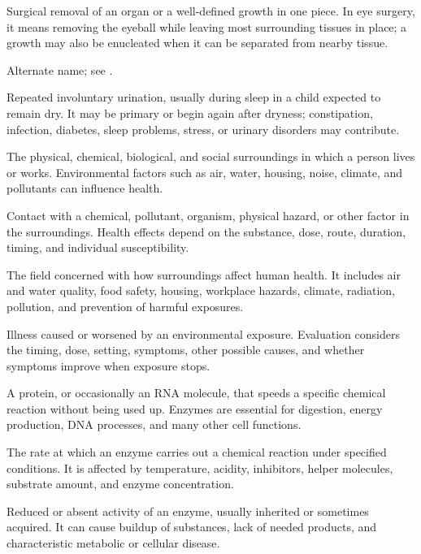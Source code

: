  Surgical removal of an organ or a well-defined growth in one piece. In eye surgery, it means removing the eyeball while leaving most surrounding tissues in place; a growth may also be enucleated when it can be separated from nearby tissue.

 Alternate name; see .

 Repeated involuntary urination, usually during sleep in a child expected to remain dry. It may be primary or begin again after dryness; constipation, infection, diabetes, sleep problems, stress, or urinary disorders may contribute.

 The physical, chemical, biological, and social surroundings in which a person lives or works. Environmental factors such as air, water, housing, noise, climate, and pollutants can influence health.

 Contact with a chemical, pollutant, organism, physical hazard, or other factor in the surroundings. Health effects depend on the substance, dose, route, duration, timing, and individual susceptibility.

 The field concerned with how surroundings affect human health. It includes air and water quality, food safety, housing, workplace hazards, climate, radiation, pollution, and prevention of harmful exposures.

 Illness caused or worsened by an environmental exposure. Evaluation considers the timing, dose, setting, symptoms, other possible causes, and whether symptoms improve when exposure stops.

 A protein, or occasionally an RNA molecule, that speeds a specific chemical reaction without being used up. Enzymes are essential for digestion, energy production, DNA processes, and many other cell functions.

 The rate at which an enzyme carries out a chemical reaction under specified conditions. It is affected by temperature, acidity, inhibitors, helper molecules, substrate amount, and enzyme concentration.

 Reduced or absent activity of an enzyme, usually inherited or sometimes acquired. It can cause buildup of substances, lack of needed products, and characteristic metabolic or cellular disease.

